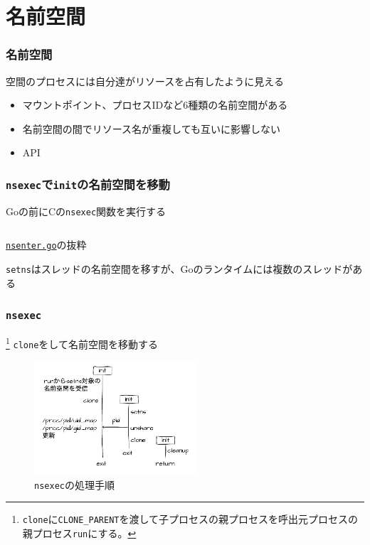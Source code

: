 \documentclass[unicode, 14pt, aspectratio=169]{beamer}
\begin{document}
\section{名前空間}
\begin{frame}
  \frametitle{名前空間\supercite{namespaces}}
  空間のプロセスには自分達がリソースを占有したように見える
  \begin{itemize}[leftmargin=0.8cm,label=$\circ$]
    \item マウントポイント、プロセスIDなど6種類の名前空間がある
    \item 名前空間の間でリソース名が重複しても互いに影響しない
    \item API
    \end{itemize}
\end{frame}
\begin{frame}
  \frametitle{\texttt{nsexec}で\texttt{init}の名前空間を移動}
  Goの前にCの\texttt{nsexec}関数を実行する
  \begin{center}
    \inputminted{go}{code/nsenter.go}
    \href{https://github.com/opencontainers/runc/blob/7cb363254b69e10320360b63fb73e0ffb5da7bf2/libcontainer/nsenter/nsenter.go\#L12}{\texttt{nsenter.go}}の抜粋
  \end{center}
  \texttt{setns}はスレッドの名前空間を移すが、Goのランタイムには複数のスレッドがある
\end{frame}
\begin{frame}
  \frametitle{\texttt{nsexec}}
  \footnote{\texttt{clone}に\texttt{CLONE\_PARENT}を渡して子プロセスの親プロセスを呼出元プロセスの親プロセス\texttt{run}にする。}
  \texttt{clone}をして名前空間を移動する
  \begin{figure}
    \centering
    \includegraphics[width=6.0cm]{images/nsenter.drawio.pdf}
    \caption{\texttt{nsexec}の処理手順}
    \label{fig:nsenter}
  \end{figure}
\end{frame}
\end{document}
